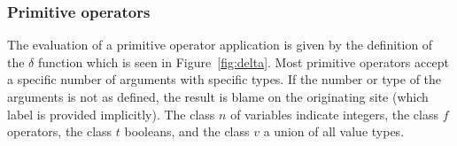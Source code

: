 \newcommand{\primonl}[4]{$\delta$(#1,$#2$) &= $#3$ & #4}
\newcommand{\primone}[4]{$\delta$(#1,$\langle #2 \rangle$) &= $\langle #3 \rangle$ & #4}
\newcommand{\primtwo}[5]{$\delta$(#1,$\langle #2, #3 \rangle$) &= $\langle #4 \rangle$ & #5}
\newcommand{\primtwe}[4]{$\delta$(#1,$\langle #2, #3 \rangle$) &= $\blame{\ell}$ & #4}
\newcommand{\primfou}[7]{$\delta$(#1,$\langle #2, #3, #4, #5\rangle$) &= $\langle #6 \rangle$ & #7}
\newcommand{\primfoe}[6]{$\delta$(#1,$\langle #2, #3, #4, #5\rangle$) &= $\blame{\ell}$ & #6}

\subsubsection{Primitive operators}

The evaluation of a primitive operator application is given by the definition of the $\delta$ function which is seen in Figure~\ref{fig:delta}.
Most primitive operators accept a specific number of arguments with specific types.
If the number or type of the arguments is not as defined, the result is blame on the originating site (which label is provided implicitly).
The class $n$ of variables indicate integers, the class $f$ operators, the class $t$ booleans, and the class $v$ a union of all value types.

